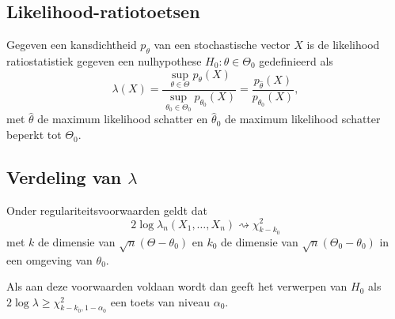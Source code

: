 \subsection{Likelihood-ratiotoetsen}
Gegeven een kansdichtheid \(p_{\theta}\) van een stochastische vector \(X\) is
de likelihood ratiostatistiek gegeven een nulhypothese \(H_{0}:\theta\in\Theta_{0}\)
gedefinieerd als
\[
    \lambda(X)=\frac{\sup_{\theta\in\Theta}p_{\theta}(X)}
    {\sup_{\theta_{0}\in\Theta_{0}}p_{\theta_{0}}(X)}=
    \frac{p_{\hat{\theta}}(X)}{p_{\hat{\theta}_{0}}(X)},
\]
met \(\hat{\theta}\) de maximum likelihood schatter en \(\hat{\theta}_{0}\) de
maximum likelihood schatter beperkt tot \(\Theta_{0}\).

\subsection{Verdeling van \texorpdfstring{\(\lambda\)}{ll}} Onder
regulariteitsvoorwaarden geldt dat
\[
    2\log\lambda_{n}(X_{1},\dots,X_{n})\rightsquigarrow\chi^{2}_{k-k_{0}}
\]
met \(k\) de dimensie van \(\sqrt{n}(\Theta-\theta_{0})\) en \(k_{0}\) de
dimensie van \(\sqrt{n}(\Theta_{0}-\theta_{0})\) in een omgeving van
\(\theta_{0}\).

Als aan deze voorwaarden voldaan wordt dan geeft het verwerpen van \(H_{0}\) als
\(2\log\lambda\geq\chi^{2}_{k-k_{0},1-\alpha_{0}}\) een toets van niveau
\(\alpha_{0}\).